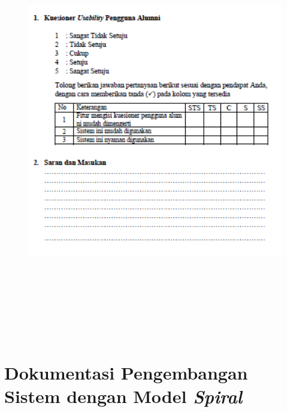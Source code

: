 \begin{figure}[H]
	\centering
	\includegraphics[width=15cm,height=18cm]{gambar/UAT/ku_pengguna}
	\label{ku_pengguna}
\end{figure}


\chapter{Dokumentasi Pengembangan Sistem dengan Model \textit{Spiral}}

